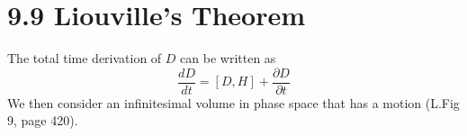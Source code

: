 \documentclass[12pt]{article}
\begin{document}
%	
	\section*{9.9 Liouville's Theorem}
	
	The total time derivation of $D$ can be written as
	\[
	\frac{dD}{dt} = [D, H] + \frac{\partial D}{\partial t}
	\]
	We then consider an infinitesimal volume in phase space that has a motion (L.Fig 9, page 420).
	
\end{document}

